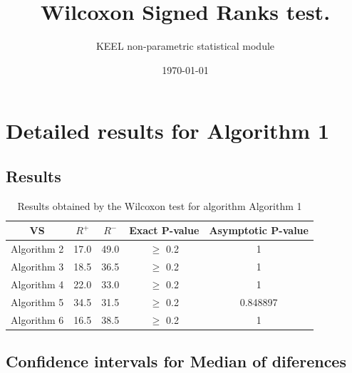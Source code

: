 \documentclass[a4paper,10pt]{article}
\title{Wilcoxon Signed Ranks test.}
\date{\today}
\author{KEEL non-parametric statistical module}
\begin{document}
\pagestyle{empty}
\maketitle
\thispagestyle{empty}



\section{Detailed results for Algorithm 1}


\subsection{Results}

\begin{table}[!htp]
\centering\small
\begin{tabular}{
|c|c|c|c|c|}
\hline
 VS & $R^{+}$ & $R^{-}$ & Exact P-value & Asymptotic P-value \\ \hline 
Algorithm 2 & 17.0 & 49.0 & $\geq$ 0.2 & 1\\ \hline 
Algorithm 3 & 18.5 & 36.5 & $\geq$ 0.2 & 1\\ \hline 
Algorithm 4 & 22.0 & 33.0 & $\geq$ 0.2 & 1\\ \hline 
Algorithm 5 & 34.5 & 31.5 & $\geq$ 0.2 & 0.848897\\ \hline 
Algorithm 6 & 16.5 & 38.5 & $\geq$ 0.2 & 1\\ \hline 

\end{tabular}
\caption{Results obtained by the Wilcoxon test for algorithm Algorithm 1}
\end{table}

\subsection{Confidence intervals for Median of diferences}
\end{document}
